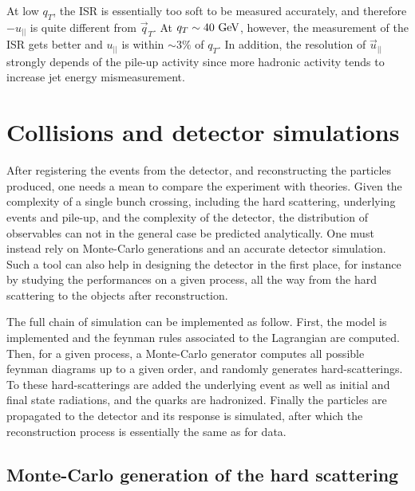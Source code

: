         At low $q_T$, the ISR is essentially too soft to be measured accurately, and
        therefore $- u_{||}$ is quite different from $\vec{q}_T$. At $q_T \sim 40~\text{GeV}$,
        however, the measurement of the ISR gets better and $u_{||}$ is within $\sim 3\%$
        of $q_T$. In addition, the resolution of $\vec{u}_{||}$ strongly depends of the
        pile-up activity since more hadronic activity tends to increase jet energy
        mismeasurement.

        \section{Collisions and detector simulations \label{sec:simu}}

            After registering the events from the detector, and reconstructing the particles
            produced, one needs a mean to compare the experiment with theories. Given
            the complexity of a single bunch crossing, including the hard scattering,
            underlying events and pile-up, and the complexity of the detector, the distribution
            of observables can not in the general case be predicted analytically. One must
            instead rely on Monte-Carlo generations and an accurate detector simulation.
            Such a tool can also help in designing the detector in the first place, for
            instance by studying the performances on a given process, all the way
            from the hard scattering to the objects after reconstruction.

            The full chain of simulation can be implemented as follow. First, the model
            is implemented and the feynman rules associated to the Lagrangian are computed.
            Then, for a given process, a Monte-Carlo generator computes all possible
            feynman diagrams up to a given order, and randomly generates hard-scatterings.
            To these hard-scatterings are added the underlying event as well as initial and
            final state radiations, and the quarks are hadronized. Finally the particles
            are propagated to the detector and its response is simulated, after which
            the reconstruction process is essentially the same as for data.

            \subsection{Monte-Carlo generation of the hard scattering}

